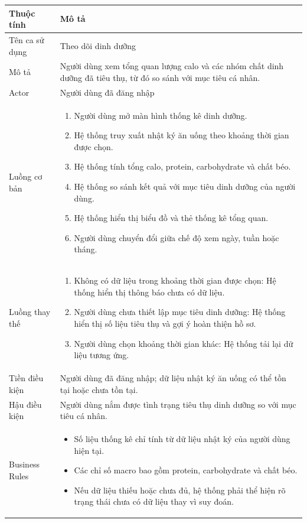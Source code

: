 \begin{longtable}{|p{4cm}|p{11cm}|}
    \hline
    \textbf{Thuộc tính} & \textbf{Mô tả} \\
    \hline
    \endhead
    \hline
    \endfoot
    Tên ca sử dụng & Theo dõi dinh dưỡng \\
    \hline
    Mô tả & Người dùng xem tổng quan lượng calo và các nhóm chất dinh dưỡng đã tiêu thụ, từ đó so sánh với mục tiêu cá nhân. \\
    \hline
    Actor & Người dùng đã đăng nhập \\
    \hline
    Luồng cơ bản &
        \begin{enumerate}[nosep]
            \item Người dùng mở màn hình thống kê dinh dưỡng.
            \item Hệ thống truy xuất nhật ký ăn uống theo khoảng thời gian được chọn.
            \item Hệ thống tính tổng calo, protein, carbohydrate và chất béo.
            \item Hệ thống so sánh kết quả với mục tiêu dinh dưỡng của người dùng.
            \item Hệ thống hiển thị biểu đồ và thẻ thống kê tổng quan.
            \item Người dùng chuyển đổi giữa chế độ xem ngày, tuần hoặc tháng.
        \end{enumerate} \\
    \hline
    Luồng thay thế &
        \begin{enumerate}[nosep]
            \item[2a.] Không có dữ liệu trong khoảng thời gian được chọn: Hệ thống hiển thị thông báo chưa có dữ liệu.
            \item[4a.] Người dùng chưa thiết lập mục tiêu dinh dưỡng: Hệ thống hiển thị số liệu tiêu thụ và gợi ý hoàn thiện hồ sơ.
            \item[6a.] Người dùng chọn khoảng thời gian khác: Hệ thống tải lại dữ liệu tương ứng.
        \end{enumerate} \\
    \hline
    Tiền điều kiện & Người dùng đã đăng nhập; dữ liệu nhật ký ăn uống có thể tồn tại hoặc chưa tồn tại. \\
    \hline
    Hậu điều kiện & Người dùng nắm được tình trạng tiêu thụ dinh dưỡng so với mục tiêu cá nhân. \\
    \hline
    Business Rules &
        \begin{itemize}[nosep]
            \item Số liệu thống kê chỉ tính từ dữ liệu nhật ký của người dùng hiện tại.
            \item Các chỉ số macro bao gồm protein, carbohydrate và chất béo.
            \item Nếu dữ liệu thiếu hoặc chưa đủ, hệ thống phải thể hiện rõ trạng thái chưa có dữ liệu thay vì suy đoán.
        \end{itemize} \\
    \hline
\end{longtable}

